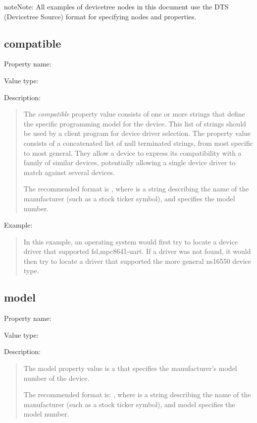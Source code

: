 \documentclass[a4paper,10pt,oneside]{sphinxmanual}
\begin{document}
\begin{notice}{note}{Note:}
All examples of devicetree nodes in this document use the
\textsc{DTS} (Devicetree Source) format for specifying nodes and properties.
\end{notice}


\subsection{compatible}
\label{devicetree-basics:compatible}\label{devicetree-basics:sect-standard-properties-compatible}
Property name: 

Value type: 

Description:
\begin{quote}

The \emph{compatible} property value consists of one or more strings that
define the specific programming model for the device. This list of
strings should be used by a client program for device driver selection.
The property value consists of a concatenated list of null terminated
strings, from most specific to most general. They allow a device to
express its compatibility with a family of similar devices, potentially
allowing a single device driver to match against several devices.

The recommended format is , where
 is a string describing the name of the manufacturer
(such as a stock ticker symbol), and  specifies the model
number.
\end{quote}

Example:
\begin{quote}


In this example, an operating system would first try to locate a device
driver that supported fsl,mpc8641-uart. If a driver was not found, it
would then try to locate a driver that supported the more general
ns16550 device type.
\end{quote}


\subsection{model}
\label{devicetree-basics:model}
Property name: 

Value type: 

Description:
\begin{quote}

The model property value is a  that specifies the manufacturer’s
model number of the device.

The recommended format is: , where
 is a string describing the name of the manufacturer
(such as a stock ticker symbol), and model specifies the model number.
\end{quote}
\end{document}
